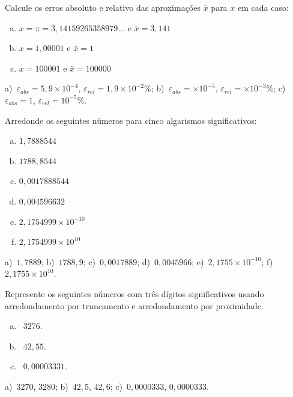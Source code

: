 \begin{exer} Calcule os erros absoluto e relativo das aproximações $\bar{x}$ para $x$ em cada caso:
  \begin{enumerate}[a)]
  \item $x=\pi=3,14159265358979\ldots$ e $\bar{x}=3,141$
  \item $x=1,00001$ e $\bar{x}=1$
  \item $x=100001$ e $\bar{x}=100000$
  \end{enumerate}
\end{exer}
\begin{resp}
  a)~$\varepsilon_{abs} = 5,9\times 10^{-4}$, $\varepsilon_{rel} = 1,9\times 10^{-2}\%$; b)~$\varepsilon_{abs} = \times 10^{-5}$, $\varepsilon_{rel} = \times 10^{-3}\%$; c)~$\varepsilon_{abs} = 1$, $\varepsilon_{rel} = 10^{-5}\%$.
\end{resp}


\begin{exer} Arredonde os seguintes números para cinco algarismos significativos:
    \begin{enumerate}[a)]
    \item $1,7888544$
    \item $1788,8544$
    \item $0,0017888544$
    \item $0,004596632$
    \item $ 2,1754999\times 10^{-10}$
    \item $ 2,1754999\times 10^{10}$
    \end{enumerate}
\end{exer}
\begin{resp}
a)~$1,7889$; b)~$1788,9$; c)~$0,0017889$; d)~$0,0045966$; e)~$2,1755\times 10^{-10}$; f)~$2,1755\times 10^{10}$.
\end{resp}

\begin{exer}  Represente os seguintes números com três dígitos significativos usando arredondamento por truncamento e arredondamento por proximidade.
  \begin{enumerate}[a)]
  \item~$3276$.
  \item~$42,55$.
  \item~$0,00003331$.
  \end{enumerate}
\end{exer}
\begin{resp}
  a)~$3270$, $3280$; b)~$42,5$, $42,6$; c)~$0,0000333$, $0,0000333$.
\end{resp}

